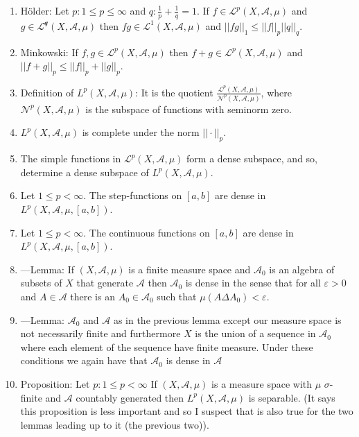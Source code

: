 \documentclass{article}
\begin{document}
\begin{enumerate}
    \item Hölder: Let $p: 1\leq p\leq\infty$ and $q: \frac{1}{p}+\frac{1}{q}=1$. If $f \in \mathscr{L}^p(X,\mathscr{A},\mu)$ and $g\in \mathscr{L^q}(X,\mathscr{A},\mu)$ then $fg \in \mathscr{L}^1(X,\mathscr{A},\mu)$ and $||fg||_1\leq ||f||_p||q||_q$.
    \item Minkowski: If $f,g\in \mathscr{L}^p(X,\mathscr{A},\mu)$ then $f+g\in \mathscr{L}^p(X,\mathscr{A},\mu)$ and $||f+g||_p \leq ||f||_p+||g||_p$.
    \item Definition of $L^p(X,\mathscr{A,\mu})$: It is the quotient $\frac{\mathscr{L}^p(X,\mathscr{A,\mu})}{\mathscr{N}^p(X,\mathscr{A,\mu})}$, where  $\mathscr{N}^p(X,\mathscr{A,\mu})$ is the subspace of functions with seminorm zero.
    \item $L^p(X,\mathscr{A},\mu)$ is complete under the norm $||\cdot||_p$.
    \item The simple functions in $\mathscr{L}^p(X,\mathscr{A},\mu)$ form a dense subspace, and so, determine a dense subspace of $L^p(X,\mathscr{A},\mu)$.
    \item Let $1\leq p <\infty$. The step-functions on $[a,b]$ are dense in $L^p(X,\mathscr{A},\mu,[a,b])$.
    \item Let $1\leq p <\infty$. The continuous functions on $[a,b]$ are dense in $L^p(X,\mathscr{A},\mu,[a,b])$.
    \item ---Lemma: If $(X,\mathscr{A},\mu)$ is a finite measure space and $\mathscr{A}_0$ is an algebra of subsets of $X$ that generate $\mathscr{A}$ then $\mathscr{A}_0$ is dense in the sense that for all $\varepsilon>0$ and $A\in \mathscr{A}$ there is an $A_0\in \mathscr{A}_0$ such that $\mu(A\Delta A_0) <\varepsilon$.
    \item ---Lemma: $\mathscr{A}_0$ and $\mathscr{A}$ as in the previous lemma except our measure space is not necessarily finite and furthermore $X$ is the union of a sequence in $\mathscr{A}_0$ where each element of the sequence have finite measure. Under these conditions we again have that $\mathscr{A}_0$ is dense in $\mathscr{A}$
    \item Proposition: Let $p:1\leq p<\infty$ If $(X,\mathscr{A,\mu})$ is a  measure space with $\mu$ $\sigma$-finite and $\mathscr{A}$ countably generated then $L^p(X,\mathscr{A},\mu)$ is separable. (It says this proposition is less important and so I suspect that is also true for the two lemmas leading up to it (the previous two)).

\end{enumerate}
\end{document}
